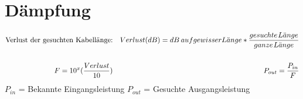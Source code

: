 \section*{Dämpfung}

\begin{tcolorbox}[colback=white]
    \begin{align*}
        \text{Verlust der gesuchten Kabellänge:} &  & Verlust (dB) = dB \hspace{0.2em} auf gewisser L\ddot{a}nge * \frac{gesuchte \hspace{0.1em} L\ddot{a}nge}{ganze \hspace{0.1em} L\ddot{a}nge} \\ \\
        F = 10^x(\frac{Verlust}{10})                   &  & P_{out} = \frac{P_{in}}{F}
    \end{align*}
    \tcblower 
    \small $P_{in}$ = Bekannte Eingangsleistung \hspace{2em} $P_{out}$ = Gesuchte Ausgangsleistung
\end{tcolorbox}